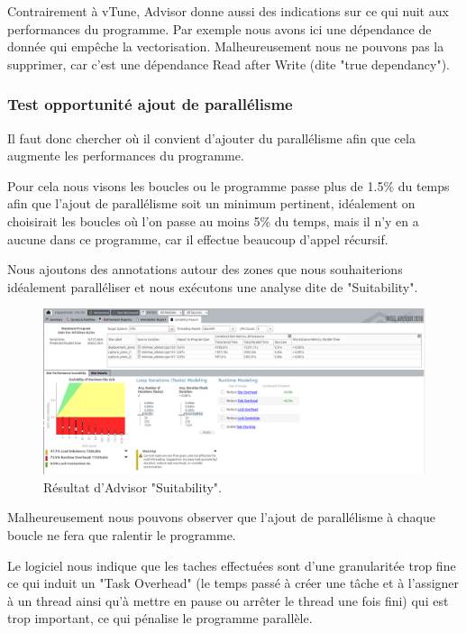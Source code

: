 \documentclass[
 aip,
 jmp,
 amsmath,amssymb,
 reprint
]{revtex4-1}
\begin{document}
Contrairement à vTune\pageref{Fig:vtune_proc_use}, Advisor donne aussi des indications sur ce qui nuit aux performances du programme. Par exemple nous avons ici une dépendance de donnée qui empêche la vectorisation. Malheureusement nous ne pouvons pas la supprimer, car c'est une dépendance Read after Write (dite "true dependancy").

\subsubsection{Test opportunité ajout de parallélisme}

Il faut donc chercher où il convient d'ajouter du parallélisme afin que cela augmente les performances du programme.\par
Pour cela nous visons les boucles ou le programme passe plus de 1.5\% du temps afin que l'ajout de parallélisme soit un minimum pertinent, idéalement on choisirait les boucles où l'on passe au moins 5\% du temps, mais il n'y en a aucune dans ce programme, car il effectue beaucoup d'appel récursif.\par
Nous ajoutons des annotations autour des zones que nous souhaiterions idéalement paralléliser et nous exécutons une analyse dite de "Suitability".

\begin{figure}[H]
  \includegraphics[width=\linewidth, keepaspectratio=true]{suitability.png}
  \caption{Résultat d'Advisor "Suitability".\label{Fig:advisor_suitability}}
\end{figure}

Malheureusement nous pouvons observer que l'ajout de parallélisme à chaque boucle ne fera que ralentir le programme.\par
Le logiciel nous indique que les taches effectuées sont d'une granularitée trop fine ce qui induit un "Task Overhead" (le temps passé à créer une tâche et à l'assigner à un thread ainsi qu'à mettre en pause ou arrêter le thread une fois fini) qui est trop important, ce qui pénalise le programme parallèle.
\end{document}
